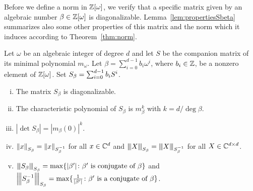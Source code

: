 Before we define a norm in $\mathbb{Z}[\omega]$, we verify that a specific matrix given by an algebraic number $\beta\in\mathbb{Z}[\omega]$ is diagonalizable. Lemma~\ref{lem:propertiesSbeta} summarizes also some other properties of this matrix and the norm which it induces according to Theorem~\ref{thm:norm}.
\begin{lem}
\label{lem:propertiesSbeta}
Let $\omega$ be an algebraic integer of degree $d$ and let $S$ be the companion matrix of its minimal polynomial $m_\omega$. Let $\beta=\sum_{i=0}^{d-1} b_i \omega^i$, where $b_i \in \mathbb{Z}$, be a nonzero element of $\mathbb{Z}[\omega]$. Set $S_\beta=\sum_{i=0}^{d-1} {b}_i S^i$.
\begin{enumerate}[i)]
   \item The matrix $S_\beta$ is diagonalizable.
   \item The characteristic polynomial of $S_\beta$ is $m_\beta^k$ with $k=d / \deg \beta$.
   \item $|\det S_\beta|=|m_\beta(0)|^k$.
   \item $\left\lVert x\right\rVert_{S_\beta}=\left\lVert x\right\rVert_{S_\beta^{-1}}$ for all $x \in \mathbb{C}^d$ and ${\left\vert\kern-0.25ex\left\vert\kern-0.25ex\left\vert X\right\vert\kern-0.25ex\right\vert\kern-0.25ex\right\vert}_{S_\beta}={\left\vert\kern-0.25ex\left\vert\kern-0.25ex\left\vert X\right\vert\kern-0.25ex\right\vert\kern-0.25ex\right\vert}_{S_\beta^{-1}}$ for all $X \in \mathbb{C}^{d\times d}$.
   \item ${\left\vert\kern-0.25ex\left\vert\kern-0.25ex\left\vert S_\beta\right\vert\kern-0.25ex\right\vert\kern-0.25ex\right\vert}_{S_\beta}=\max \{|\beta'| \colon \beta' \text{ is conjugate of } \beta\}$ and $ {\left\vert\kern-0.25ex\left\vert\kern-0.25ex\left\vert S_\beta^{-1}\right\vert\kern-0.25ex\right\vert\kern-0.25ex\right\vert}_{S_\beta}=\max \{\frac{1}{|\beta'|} \colon \beta' \text{ is a conjugate of } \beta\}$.
\end{enumerate}  
\end{lem}
